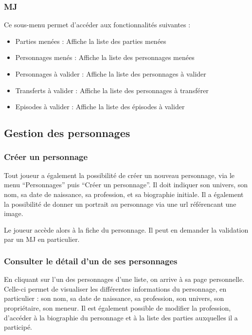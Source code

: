 \documentclass[a4paper, 11pt, titlepage]{article}
\begin{document}
\subsubsection {MJ}

Ce sous-menu permet d'accéder aux fonctionnalités suivantes :

\begin{itemize}
\item
Parties menées : Affiche la liste des parties menées

\item
Personnages menés : Affiche la liste des personnages menées

\item
Personnages à valider : Affiche la liste des personnages à valider

\item
Transferts à valider : Affiche la liste des personnages à transférer

\item
Episodes à valider : Affiche la liste des épisodes à valider

\end{itemize}


\subsection {Gestion des personnages}

\subsubsection {Créer un personnage}

Tout joueur a également la possibilité de créer un nouveau personnage, via le menu “Personnages” puis “Créer un personnage”. Il doit indiquer son univers, son nom, sa date de naissance, sa profession, et sa biographie initiale. Il a également la possibilité de donner un portrait au personnage via une url référencant une image.

Le joueur accède alors à la fiche du personnage. Il peut en demander la validation par un MJ en particulier.

\subsubsection {Consulter le détail d'un de ses personnages}

En cliquant sur l'un des personnages d'une liste, on arrive à sa page personnelle. Celle-ci permet de visualiser les différentes informations du personnage, en particulier : son nom, sa date de naissance, sa profession, son univers, son propriétaire, son meneur.
Il est également possible de modifier la profession, d'accéder à la biographie du personnage et à la liste des parties auxquelles il a participé.
\end{document}
